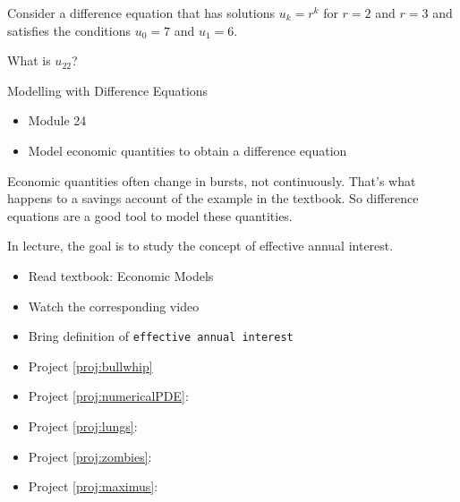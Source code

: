 \bookonlynewpage


\question
	Consider a difference equation that has solutions $u_k = r^k$ for $r=2$ and $r=3$ and satisfies the conditions $u_0 = 7$ and $u_1=6$.
	
	What is $u_{22}$?



\standardonlynewpage

%
%



\begin{module}{Modelling with Difference Equations}
	\label{diff:model}

	
	
\end{module}



\begin{lesson}

	\begin{itemize}
		\item Module 24
	\end{itemize}

	\begin{itemize}
		\item Model economic quantities to obtain a difference equation
	\end{itemize}
	

Economic quantities often change in bursts, not continuously. That's what happens to a savings account of the example in the textbook. So difference equations are a good tool to model these quantities.

In lecture, the goal is to study the concept of effective annual interest.


\begin{itemize}
	\item Read textbook: Economic Models
	\item Watch the corresponding video
	\item Bring definition of {\tt effective annual interest}
\end{itemize}

\begin{itemize}
	\item Project \ref{proj:bullwhip} \bullwhiptitle
	\item Project \ref{proj:numericalPDE}: \numericalPDEtitle
	\item Project \ref{proj:lungs}:\lungstitle
	\item Project \ref{proj:zombies}: \zombiestitle
	\item Project \ref{proj:maximus}: \maximustitle
\end{itemize}


\end{lesson}



